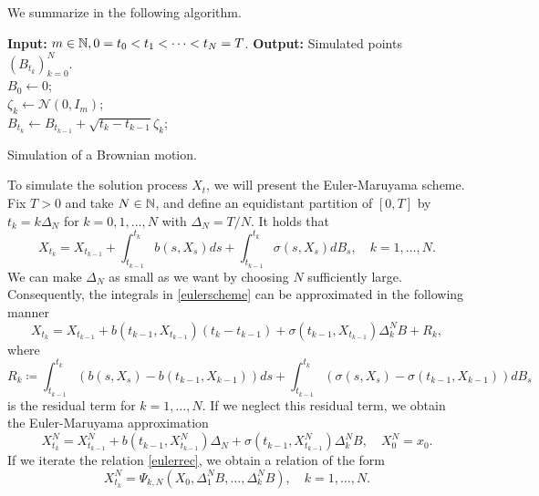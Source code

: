 We summarize in the following algorithm.
\begin{algorithm}[H]
\SetAlgoLined
    \textbf{Input:} $m\in\mathbb{N}, 0=t_{0}<t_{1}<\dots <t_{N}=T$.\newline
    \textbf{Output:} Simulated points $(B_{t_{k}})_{k=0}^{N}$.\\
    $B_{0}\gets 0$; \\
    {$\zeta_{k} \gets \mathcal{N}(0,I_{m})$;\\
    $B_{t_{k}}\gets B_{t_{k-1}} + \sqrt{t_{k}-t_{k-1}}\zeta_{k}$;}
\caption{Simulation of a Brownian motion.}
\label{alg:BM}
\end{algorithm}
To simulate the solution process $X_{t}$, we will present the Euler-Maruyama scheme. Fix $T>0$ and take $N\in \mathbb{N}$, and define an equidistant partition of $[0,T]$ by $t_{k}=k\Delta_{N}$ for $k=0,1,\dots,N$ with $\Delta_{N}=T/N$. It holds that
\begin{equation}\label{eulerscheme}
    X_{t_{k}}=X_{t_{k-1}} + \int_{t_{k-1}}^{t_{k}}b(s,X_{s})ds + \int_{t_{k-1}}^{t_{k}}\sigma(s,X_{s})dB_{s}, \quad k=1,\dots,N.
\end{equation}
We can make $\Delta_{N}$ as small as we want by choosing $N$ sufficiently large. Consequently, the integrals in \eqref{eulerscheme} can be approximated in the following manner
\begin{equation}
    X_{t_{k}}=X_{t_{k-1}} + b(t_{k-1},X_{t_{k-1}})(t_{k}-t_{k-1}) + \sigma(t_{k-1},X_{t_{k-1}})\Delta_{k}^{N}B + R_{k},
\end{equation}
where
\begin{equation}
    R_{k}\coloneqq \int_{t_{k-1}}^{t_{k}}\left(b(s,X_{s}) - b(t_{k-1},X_{k-1})\right)ds  + \int_{t_{k-1}}^{t_{k}}\left(\sigma(s,X_{s}) - \sigma(t_{k-1},X_{k-1})\right)dB_{s}
\end{equation}
is the residual term for $k=1,\dots, N$. If we neglect this residual term, we obtain the Euler-Maruyama approximation
\begin{equation}\label{eulerrec}
    X_{t_{k}}^{N}=X_{t_{k-1}}^{N} + b(t_{k-1},X_{t_{k-1}}^{N})\Delta_{N} + \sigma(t_{k-1},X_{t_{k-1}}^{N})\Delta_{k}^{N}B,\quad X_{0}^{N}=x_{0}.
\end{equation}
If we iterate the relation \eqref{eulerrec}, we obtain a relation of the form
\begin{equation}
    X_{t_{k}}^{N}=\Psi_{k,N}(X_{0},\Delta_{1}^{N}B,\dots,\Delta_{k}^{N}B), \quad k=1,\dots,N.
\end{equation}
